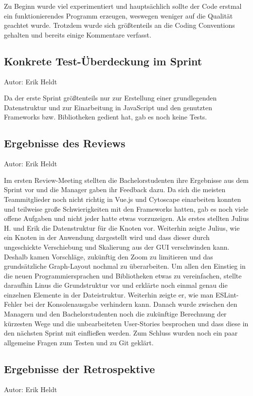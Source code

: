 Zu Beginn wurde viel experimentiert und hauptsächlich sollte der Code erstmal ein funktionierendes Programm erzeugen, weswegen weniger auf die Qualität geachtet wurde. Trotzdem wurde sich größtenteils an die Coding Conventions gehalten und bereits einige Kommentare verfasst.

\subsection{Konkrete Test-Überdeckung im Sprint}
{\small Autor: Erik Heldt}

Da der erste Sprint größtenteils nur zur Erstellung einer grundlegenden Datenstruktur und zur Einarbeitung in JavaScript und den genutzten Frameworks bzw. Bibliotheken gedient hat, gab es noch keine Tests.

\subsection{Ergebnisse des Reviews}
{\small Autor: Erik Heldt}

Im ersten Review-Meeting stellten die Bachelorstudenten ihre Ergebnisse aus dem Sprint vor und die Manager gaben ihr Feedback dazu. Da sich die meisten Teammitglieder noch nicht richtig in Vue.js und Cytoscape einarbeiten konnten und teilweise große Schwierigkeiten mit den Frameworks hatten, gab es noch viele offene Aufgaben und nicht jeder hatte etwas vorzuzeigen.
Als erstes stellten Julius H. und Erik die Datenstruktur für die Knoten vor. Weiterhin zeigte Julius, wie ein Knoten in der Anwendung dargestellt wird und dass dieser durch ungeschickte Verschiebung und Skalierung aus der GUI verschwinden kann. Deshalb kamen Vorschläge, zukünftig den Zoom zu limitieren und das grundsätzliche Graph-Layout nochmal zu überarbeiten.
Um allen den Einstieg in die neuen Programmiersprachen und Bibliotheken etwas zu vereinfachen, stellte daraufhin Linus die Grundstruktur vor und erklärte noch einmal genau die einzelnen Elemente in der Dateistruktur. Weiterhin zeigte er, wie man ESLint-Fehler bei der Konsolenausgabe verhindern kann.
Danach wurde zwischen den Managern und den Bachelorstudenten noch die zukünftige Berechnung der kürzesten Wege und die unbearbeiteten User-Stories besprochen und dass diese in den nächsten Sprint mit einfließen werden.
Zum Schluss wurden noch ein paar allgemeine Fragen zum Testen und zu Git geklärt.

\subsection{Ergebnisse der Retrospektive}
{\small Autor: Erik Heldt}

